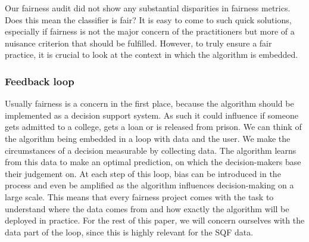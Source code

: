 



Our fairness audit did not show any substantial disparities in fairness metrics. Does this mean the classifier is fair?
It is easy to come to such quick solutions, especially if fairness is not the major concern of the practitioners but more of a nuisance criterion that should be fulfilled. However, to truly ensure a fair practice, it is crucial to look at the context in which the algorithm is embedded.

\subsubsection*{Feedback loop}
Usually fairness is a concern in the first place, because the algorithm should be implemented as a decision support system. As such it could influence if someone gets admitted to a college, gets a loan or is released from prison. We can think of the algorithm being embedded in a loop with data and the user.
We make the circumstances of a decision measurable by collecting data. The algorithm learns from this data to make an optimal prediction, on which the decision-makers base their judgement on. At each step of this loop, bias can be introduced in the process and even be amplified as the algorithm influences decision-making on a large scale.
This means that every fairness project comes with the task to understand where the data comes from and how exactly the algorithm will be deployed in practice. For the rest of this paper, we will concern ourselves with the data part of the loop, since this is highly relevant for the SQF data.

